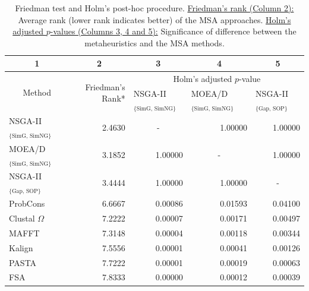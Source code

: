 \begin{table}[!h]
	\scriptsize
	\centering
	\caption[Friedman test and Holm's post-hoc procedure to assess the significance of improvement achieved by MO approach over existing methods.]{Friedman test and Holm's post-hoc procedure. \underline{Friedman's rank (Column 2):} Average rank (lower rank indicates better) of the MSA approaches. \underline{Holm's adjusted $p$-values (Columns 3, 4 and 5):} Significance of difference between the metaheuristics and the MSA methods.}
	\begin{tabular}{|l|r||c|c|c|}
		\hline
		\multicolumn{1}{|c|}{1} & \multicolumn{1}{c||}{2} & 3     & 4     & 5 \\
		\hline
		\multicolumn{1}{|c|}{\multirow{2}{*}{Method}} & \multirow{2}{*}{Friedman's Rank*} & \multicolumn{3}{c|}{Holm's adjusted $p$-value} \\
		\cline{3-5}      &  & \multicolumn{1}{l|}{NSGA-II$_{\text{\{SimG, SimNG\}}}$} & \multicolumn{1}{l|}{MOEA/D$_{\text{\{SimG, SimNG\}}}$} & \multicolumn{1}{l|}{NSGA-II$_{\text{\{Gap, SOP\}}}$} \\
		\hline
		NSGA-II$_{\text{\{SimG, SimNG\}}}$ & 2.4630 & -     & \multicolumn{1}{r|}{1.00000} & \multicolumn{1}{r|}{1.00000} \\
		\hline
		MOEA/D$_{\text{\{SimG, SimNG\}}}$ & 3.1852 & \multicolumn{1}{r|}{1.00000} & -     &  \multicolumn{1}{r|}{1.00000} \\
		\hline
		NSGA-II$_{\text{\{Gap, SOP\}}}$ & 3.4444 & \multicolumn{1}{r|}{1.00000} &    \multicolumn{1}{r|}{1.00000}   & - \\
		\hline
		ProbCons & 6.6667 & \multicolumn{1}{r|}{0.00086} & \multicolumn{1}{r|}{0.01593} & \multicolumn{1}{r|}{0.04100} \\
		\hline
		Clustal $\Omega$ & 7.2222 & \multicolumn{1}{r|}{0.00007} & \multicolumn{1}{r|}{0.00171} & \multicolumn{1}{r|}{0.00497} \\
		\hline
		MAFFT & 7.3148 & \multicolumn{1}{r|}{0.00004} & \multicolumn{1}{r|}{0.00118} & \multicolumn{1}{r|}{0.00344} \\
		\hline
		Kalign & 7.5556 & \multicolumn{1}{r|}{0.00001} & \multicolumn{1}{r|}{0.00041} & \multicolumn{1}{r|}{0.00126} \\
		\hline
		PASTA & 7.7222 & \multicolumn{1}{r|}{0.00001} & \multicolumn{1}{r|}{0.00019} & \multicolumn{1}{r|}{0.00063} \\
		\hline
		FSA   & 7.8333 & \multicolumn{1}{r|}{0.00000} & \multicolumn{1}{r|}{0.00012} & \multicolumn{1}{r|}{0.00039} \\

\end{tabular}
\end{table}
